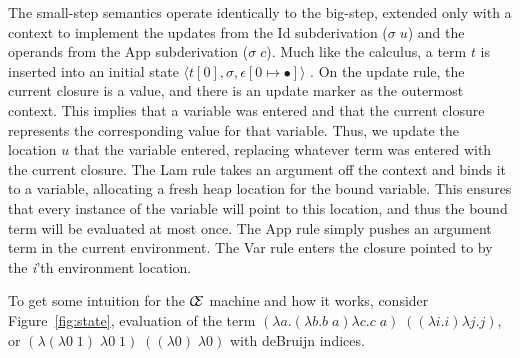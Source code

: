 The small-step semantics operate identically to the big-step, extended only with
a context to implement the updates from the Id subderivation ($\sigma \; u$) and
the operands from the App subderivation ($\sigma \; c$).  Much like the
calculus, a term $t$ is inserted into an initial state $\langle t[0], \sigma,
\epsilon[0\mapsto\bullet]\rangle$ . On the update rule, the current closure is a
value, and there is an update marker as the outermost context.  This implies
that a variable was entered and that the current closure represents the
corresponding value for that variable. Thus, we update the location $u$ that the
variable entered, replacing whatever term was entered with the current closure.
The Lam rule takes an argument off the context and binds it to a variable,
allocating a fresh heap location for the bound variable. This ensures that every
instance of the variable will point to this location, and thus the bound term
will be evaluated at most once. The App rule simply pushes an argument term in
the current environment. The Var rule enters the closure pointed to by the
\textit{i}'th environment location.  

To get some intuition for the $\mathcal{\mathcal{C} \mskip -4mu \mathcal{E}}$
machine and how it works, consider Figure~\ref{fig:state}, evaluation of the
term $(\lambda a.(\lambda b.b \; a) \lambda c.c \; a) \; ((\lambda i.i)
\lambda j.j)$, or $(\lambda(\lambda0\;1)\;\lambda0\;1)\;((\lambda0)\;
\lambda0)$ with deBruijn indices.

